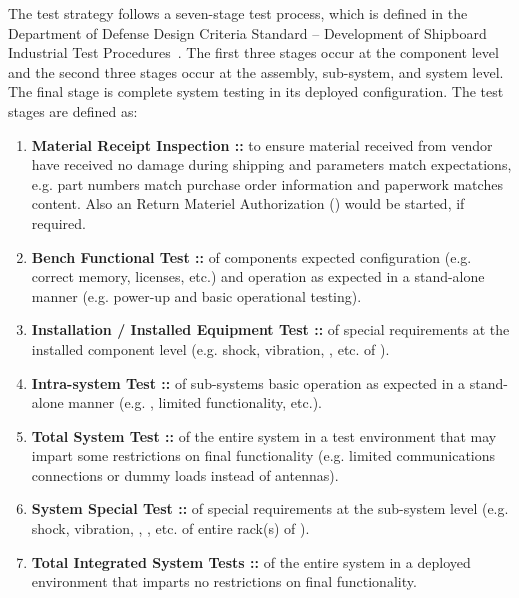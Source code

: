 The test strategy follows a seven-stage test process, which is defined in the Department of Defense Design Criteria Standard -- Development of Shipboard Industrial Test Procedures~\cite{ref__DOD_STD_2106_NAVY}.
The first three stages occur at the component level and the second three stages occur at the assembly, sub-system, and system level.
The final stage is complete system testing in its deployed configuration.
The test stages are defined as:
\begin{enumerate}
	\item {\bf Material Receipt Inspection :: } to ensure material received from vendor have received no damage during shipping and parameters match expectations, e.g. part numbers match purchase order information and paperwork matches content.  Also an Return Materiel Authorization (\RMA) would be started, if required.
	\item {\bf Bench Functional Test :: } of components expected configuration (e.g. correct memory, licenses, etc.) and operation as expected in a stand-alone manner (e.g. power-up and basic operational testing).
	\item {\bf Installation / Installed Equipment Test :: } of special requirements at the installed component level (e.g. shock, vibration, \EMI, etc. of \LRUs).
	\item {\bf Intra-system Test  :: } of sub-systems basic operation as expected in a stand-alone manner (e.g. \SWaP, limited functionality, etc.).
	\item {\bf Total System Test :: } of the entire system in a test environment that may impart some restrictions on final functionality (e.g. limited communications connections or dummy loads instead of antennas).
	\item {\bf System Special Test :: } of special requirements at the sub-system level (e.g. shock, vibration, \EMI, \EMC, etc. of entire rack(s) of \LRUs).
	\item {\bf Total Integrated System Tests :: } of the entire system in a deployed environment that imparts no restrictions on final functionality.
\end{enumerate}